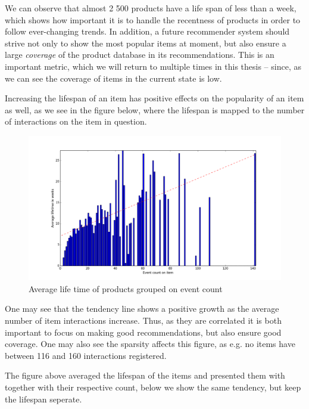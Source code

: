 We can observe that almost 2 500 products have a life span of less than a week,
which shows how important it is to handle the recentness of products in order
to follow ever-changing trends. In addition, a future recommender system should
strive not only to show the most popular items at moment, but also ensure a
large \textit{coverage} of the product database in its recommendations. This is
an important metric, which we will return to multiple times in this thesis --
since, as we can see the coverage of items in the current state is low.

Increasing the lifespan of an item has positive effects on the popularity of an
item as well, as we see in the figure below, where the lifespan is mapped to
the number of interactions on the item in question.

\begin{figure}[H]
  \centering
  \includegraphics[width=5in]{image/avglifetimeoncount.png}
  \caption{Average life time of products grouped on event count}
  \label{figure:averageLifetimBasedoncount}
\end{figure}

One may see that the tendency line shows a positive growth as the average
number of item interactions increase. Thus, as they are correlated it is both
important to focus on making good recommendations, but also ensure good
coverage. One may also see the sparsity affects this figure, as e.g. no items
have between 116 and 160 interactions registered.

The figure above averaged the lifespan of the items and presented them with
together with their respective count, below we show the same tendency, but keep
the lifespan seperate.

